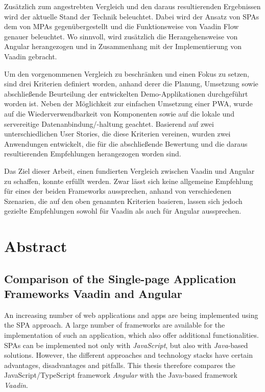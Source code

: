 \documentclass[a4paper,12pt,twoside]{scrreprt}
\begin{document}
\smallskip

Zusätzlich zum angestrebten Vergleich und den daraus resultierenden Ergebnissen wird der aktuelle Stand der Technik beleuchtet. Dabei wird der Ansatz von \acsp{SPA} dem von \acsp{MPA} gegenübergestellt und die Funktionsweise von Vaadin Flow genauer beleuchtet. Wo sinnvoll, wird zusätzlich die Herangehensweise von Angular herangezogen und in Zusammenhang mit der Implementierung von Vaadin gebracht.

\smallskip

Um den vorgenommenen Vergleich zu beschränken und einen Fokus zu setzen, sind drei Kriterien definiert worden, anhand derer die Planung, Umsetzung sowie abschließende Beurteilung der entwickelten Demo-Applikationen durchgeführt worden ist. Neben der Möglichkeit zur einfachen Umsetzung einer \acs{PWA}, wurde auf die Wiederverwendbarkeit von Komponenten sowie auf die lokale und servereitige Datenanbindung/-haltung geachtet. Basierend auf zwei unterschiedlichen User Stories, die diese Kriterien vereinen, wurden zwei Anwendungen entwickelt, die für die abschließende Bewertung und die daraus resultierenden Empfehlungen herangezogen worden sind.

\smallskip

Das Ziel dieser Arbeit, einen fundierten Vergleich zwischen Vaadin und Angular zu schaffen, konnte erfüllt werden. Zwar lässt sich keine allgemeine Empfehlung für eines der beiden Frameworks aussprechen, anhand von verschiedenen Szenarien, die auf den oben genannten Kriterien basieren, lassen sich jedoch gezielte Empfehlungen sowohl für Vaadin als auch für Angular aussprechen.

\newpage
\section*{Abstract}
\label{sec:abstract}

\subsection*{Comparison of the Single-page Application Frameworks Vaadin and Angular}

An increasing number of web applications and apps are being implemented using the \acs{SPA} approach. A large number of frameworks are available for the implementation of such an application, which also offer additional functionalities. \acsp{SPA} can be implemented not only with \textit{JavaScript}, but also with \textit{Java}-based solutions. However, the different approaches and technology stacks have certain advantages, disadvantages and pitfalls. This thesis therefore compares the JavaScript/TypeScript framework \textit{Angular} with the Java-based framework \textit{Vaadin}.
\end{document}
